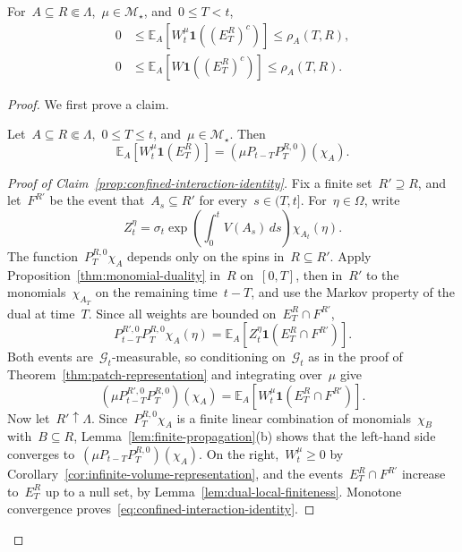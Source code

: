 \documentclass[EJP,preprint,NODS,nobera]{ejpecp}
\newcommand{\E}{\mathbb{E}}
\newcommand{\bb}[1]{\left(#1\right)}
\newcommand{\Cb}[1]{\left[#1\right]}
\newcommand{\ind}{\mathbf{1}}
\newcommand{\chg}[1]{{\color{changegreen}#1}}
\begin{document}
\begin{lemma}
\label{lem:spatial-confinement}
For~$A\subseteq R\Subset\Lambda$,~$\mu\in\mathcal M_\star$, and~$0\leq T<t$,
\begin{align}
0
&\leq
\E_A\Cb{W_t^\mu\ind\bb{(E_T^R)^c}}
\leq
\rho_A(T,R),
\label{eq:finite-horizon-confinement-bound}
\\
0
&\leq
\E_A\Cb{W\ind\bb{(E_T^R)^c}}
\leq
\rho_A(T,R).
\label{eq:limiting-confinement-bound}
\end{align}
\end{lemma}

\begin{proof}
We first prove a claim.

\begin{claim}
\label{prop:confined-interaction-identity}
Let~$A\subseteq R\Subset\Lambda$,~$0\leq T\leq t$, and~\chg{$\mu\in\mathcal M_\star$}. Then
\begin{equation}
\label{eq:confined-interaction-identity}
\E_A\Cb{W_t^\mu\ind\bb{E_T^R}}
=
(\mu P_{t-T}P_T^{R,0})(\chi_A).
\end{equation}
\end{claim}

\chg{\begin{proof}[Proof of Claim~\ref{prop:confined-interaction-identity}]
Fix a finite set~$R'\supseteq R$, and let~$F^{R'}$ be the event that~$A_s\subseteq R'$
for every~$s\in(T,t]$. For~$\eta\in\Omega$, write
\begin{equation*}
Z_t^\eta
=
\sigma_t
\exp\bb{\int_0^tV(A_s)\,ds}
\chi_{A_t}(\eta).
\end{equation*}
The function~$P_T^{R,0}\chi_A$ depends only on the spins in~$R\subseteq R'$.
Apply Proposition~\ref{thm:monomial-duality} in~$R$ on~$[0,T]$, then in~$R'$
to the monomials~$\chi_{A_T}$ on the remaining time~$t-T$, and use the Markov
property of the dual at time~$T$. Since all weights are bounded on~$E_T^R\cap F^{R'}$,
\begin{equation*}
P_{t-T}^{R',0}P_T^{R,0}\chi_A(\eta)
=
\E_A\Cb{Z_t^\eta\ind\bb{E_T^R\cap F^{R'}}}.
\end{equation*}
Both events are~$\mathcal G_t$-measurable, so conditioning on~$\mathcal G_t$ as in
the proof of Theorem~\ref{thm:patch-representation} and integrating over~$\mu$ give
\begin{equation*}
(\mu P_{t-T}^{R',0}P_T^{R,0})(\chi_A)
=
\E_A\Cb{W_t^\mu\ind\bb{E_T^R\cap F^{R'}}}.
\end{equation*}
Now let~$R'\uparrow\Lambda$. Since~$P_T^{R,0}\chi_A$ is a finite linear combination of
monomials~$\chi_B$ with~$B\subseteq R$, Lemma~\ref{lem:finite-propagation}(b)
shows that the left-hand side converges to~$(\mu P_{t-T}P_T^{R,0})(\chi_A)$. On
the right,~$W_t^\mu\geq0$ by Corollary~\ref{cor:infinite-volume-representation},
and the events~$E_T^R\cap F^{R'}$ increase to~$E_T^R$ up to a null set, by
Lemma~\ref{lem:dual-local-finiteness}. Monotone convergence proves~\eqref{eq:confined-interaction-identity}.
\end{proof}}


\end{proof}
\end{document}

